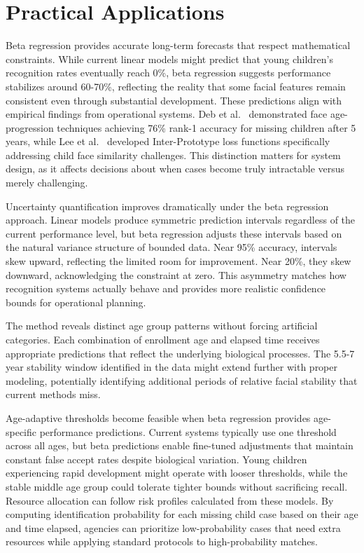 \documentclass[10pt,journal,compsoc]{IEEEtran}
\begin{document}
\section{Practical Applications}
\label{sec:applications}

Beta regression provides accurate long-term forecasts that respect mathematical constraints. While current linear models might predict that young children's recognition rates eventually reach 0\%, beta regression suggests performance stabilizes around 60-70\%, reflecting the reality that some facial features remain consistent even through substantial development. These predictions align with empirical findings from operational systems. Deb et al.~\cite{deb2021missing} demonstrated face age-progression techniques achieving 76\% rank-1 accuracy for missing children after 5 years, while Lee et al.~\cite{lee2021} developed Inter-Prototype loss functions specifically addressing child face similarity challenges. This distinction matters for system design, as it affects decisions about when cases become truly intractable versus merely challenging.

Uncertainty quantification improves dramatically under the beta regression approach. Linear models produce symmetric prediction intervals regardless of the current performance level, but beta regression adjusts these intervals based on the natural variance structure of bounded data. Near 95\% accuracy, intervals skew upward, reflecting the limited room for improvement. Near 20\%, they skew downward, acknowledging the constraint at zero. This asymmetry matches how recognition systems actually behave and provides more realistic confidence bounds for operational planning.

The method reveals distinct age group patterns without forcing artificial categories. Each combination of enrollment age and elapsed time receives appropriate predictions that reflect the underlying biological processes. The 5.5-7 year stability window identified in the data might extend further with proper modeling, potentially identifying additional periods of relative facial stability that current methods miss.

Age-adaptive thresholds become feasible when beta regression provides age-specific performance predictions. Current systems typically use one threshold across all ages, but beta predictions enable fine-tuned adjustments that maintain constant false accept rates despite biological variation. Young children experiencing rapid development might operate with looser thresholds, while the stable middle age group could tolerate tighter bounds without sacrificing recall. Resource allocation can follow risk profiles calculated from these models. By computing identification probability for each missing child case based on their age and time elapsed, agencies can prioritize low-probability cases that need extra resources while applying standard protocols to high-probability matches.
\end{document}
